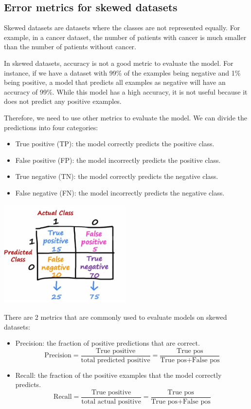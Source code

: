 \subsection*{Error metrics for skewed datasets}
Skewed datasets are datasets where the classes are not represented equally. For example, in a cancer dataset,
the number of patients with cancer is much smaller than the number of patients without cancer.
\par
In skewed datasets, accuracy is not a good metric to evaluate the model.
For instance, if we have a dataset with 99\% of the examples being negative and 1\% being positive,
a model that predicts all examples as negative will have an accuracy of 99\%. While this model has a high accuracy,
it is not useful because it does not predict any positive examples.
\par
Therefore, we need to use other metrics to evaluate the model. We can divide the predictions into four categories:
\begin{itemize}
    \item True positive (TP): the model correctly predicts the positive class.
    \item False positive (FP): the model incorrectly predicts the positive class.
    \item True negative (TN): the model correctly predicts the negative class.
    \item False negative (FN): the model incorrectly predicts the negative class.
\end{itemize}
\par
\begin{center}
    \includegraphics*[width=0.5\textwidth]{images/10.28}
\end{center}
\par
There are 2 metrics that are commonly used to evaluate models on skewed datasets:
\begin{itemize}
    \item Precision: the fraction of positive predictions that are correct.
    \[ \text{Precision} = \frac{\text{True positive}}{\text{total predicted positive}} = \frac{\text{True pos}}{\text{True pos} + \text{False pos}} \]
    \item Recall: the fraction of the positive examples that the model correctly predicts.
    \[ \text{Recall} = \frac{\text{True positive}}{\text{total actual positive}} = \frac{\text{True pos}}{\text{True pos} + \text{False pos}} \]
\end{itemize}
